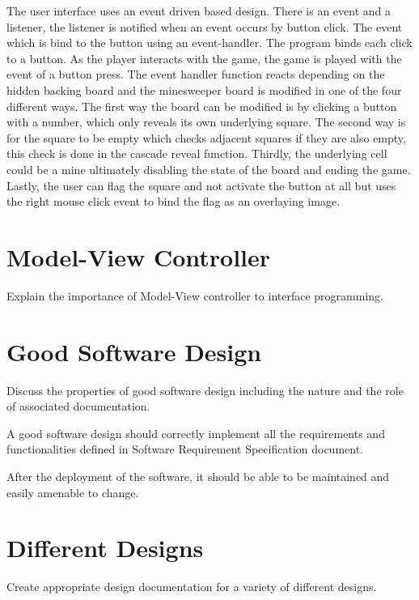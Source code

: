 \documentclass[12pt, a4]{report}
\begin{document}
	The user interface uses an event driven based design. There is an event and a listener, the listener is notified when an event occurs by button click. The event which is bind to the button using an event-handler. The program binds each click to a button. As the player interacts with the game, the game is played with the event of a button press. The event handler function reacts depending on the hidden backing board and the minesweeper board is modified in one of the four different ways. The first way the board can be modified is by clicking a button with a number, which only reveals its own underlying square. The second way is for the square to be empty which checks adjacent squares if they are also empty, this check is done in the cascade reveal function. Thirdly, the underlying cell could be a mine ultimately disabling the state of the board and ending the game. Lastly, the user can flag the square and not activate the button at all but uses the right mouse click event to bind the flag as an overlaying image. 
	\section{Model-View Controller}
	Explain the importance of Model-View controller to interface programming.
	
	\section{Good Software Design}
	Discuss the properties of good software design including the nature and the role of associated documentation.
	
	A good software design should correctly implement all the requirements and functionalities defined in Software Requirement Specification document. 
	
	After the deployment of the software, it should be able to be maintained and easily amenable to change. 
	
	
	\section{Different Designs}
	Create appropriate design documentation for a variety of different designs.

	
\end{document}
